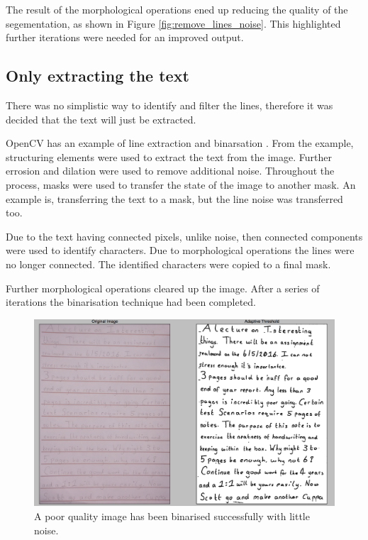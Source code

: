 The result of the morphological operations ened up reducing the quality of the segementation, as shown in Figure \ref{fig:remove_lines_noise}. This highlighted further iterations were needed for an improved output.

\subsection{Only extracting the text}
There was no simplistic way to identify and filter the lines, therefore it was decided that the text will just be extracted.

OpenCV has an example of line extraction and binarsation \cite{citeulike:14006256}. From the example, structuring elements were used to extract the text from the image. Further errosion and dilation were used to remove additional noise. Throughout the process, masks were used to transfer the state of the image to another mask. An example is, transferring the text to a mask, but the line noise was transferred too.

Due to the text having connected pixels, unlike noise, then connected components were used to identify characters. Due to morphological operations the lines were no longer connected. The identified characters were copied to a final mask.

Further morphological operations cleared up the image. After a series of iterations the binarisation technique had been completed.

\begin{figure}[H]
  \centering
  \includegraphics[scale=0.3]{images/hard_image}
  \caption{A poor quality image has been binarised successfully with little noise.}
  \label{fig:poor_quality}
\end{figure}

